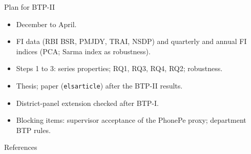 \documentclass[aspectratio=169,11pt]{beamer}
\begin{document}
\begin{frame}{Plan for BTP-II}
\begin{itemize}
\item December to April. %
\item FI data (RBI BSR, PMJDY, TRAI, NSDP) and quarterly and annual FI indices (PCA; Sarma index as robustness). %
\item Steps 1 to 3: series properties; RQ1, RQ3, RQ4, RQ2; robustness. %
\item Thesis; paper (\texttt{elsarticle}) after the BTP-II results. %
\item District-panel extension checked after BTP-I. %
\item Blocking items: supervisor acceptance of the PhonePe proxy; department BTP rules. %
\end{itemize}
\end{frame}

\nocite{ncp2020}
\begin{frame}[allowframebreaks]{References}
\tiny


\end{frame}
\end{document}

